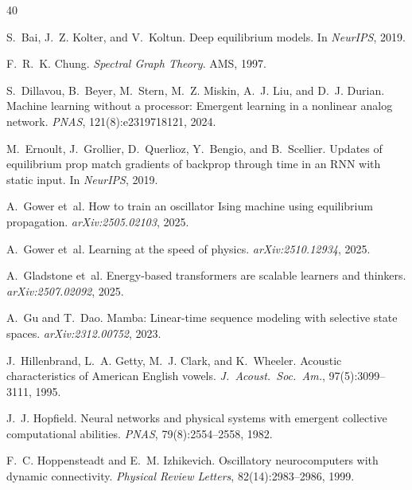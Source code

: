 \documentclass[11pt,a4paper]{article}
\begin{document}
\begin{thebibliography}{40}

S.~Bai, J.~Z. Kolter, and V.~Koltun.
\newblock Deep equilibrium models.
\newblock In \emph{NeurIPS}, 2019.

F.~R.~K. Chung.
\newblock \emph{Spectral Graph Theory}.
\newblock AMS, 1997.

S.~Dillavou, B.~Beyer, M.~Stern, M.~Z. Miskin, A.~J. Liu, and D.~J. Durian.
\newblock Machine learning without a processor: Emergent learning in a
  nonlinear analog network.
\newblock \emph{PNAS}, 121(8):e2319718121, 2024.

M.~Ernoult, J.~Grollier, D.~Querlioz, Y.~Bengio, and B.~Scellier.
\newblock Updates of equilibrium prop match gradients of backprop through time
  in an {RNN} with static input.
\newblock In \emph{NeurIPS}, 2019.

A.~Gower et~al.
\newblock How to train an oscillator {I}sing machine using equilibrium
  propagation.
\newblock \emph{arXiv:2505.02103}, 2025.

A.~Gower et~al.
\newblock Learning at the speed of physics.
\newblock \emph{arXiv:2510.12934}, 2025.

A.~Gladstone et~al.
\newblock Energy-based transformers are scalable learners and thinkers.
\newblock \emph{arXiv:2507.02092}, 2025.

A.~Gu and T.~Dao.
\newblock Mamba: Linear-time sequence modeling with selective state spaces.
\newblock \emph{arXiv:2312.00752}, 2023.

J.~Hillenbrand, L.~A. Getty, M.~J. Clark, and K.~Wheeler.
\newblock Acoustic characteristics of {A}merican {E}nglish vowels.
\newblock \emph{J.\ Acoust.\ Soc.\ Am.}, 97(5):3099--3111, 1995.

J.~J. Hopfield.
\newblock Neural networks and physical systems with emergent collective
  computational abilities.
\newblock \emph{PNAS}, 79(8):2554--2558, 1982.

F.~C. Hoppensteadt and E.~M. Izhikevich.
\newblock Oscillatory neurocomputers with dynamic connectivity.
\newblock \emph{Physical Review Letters}, 82(14):2983--2986, 1999.


\end{thebibliography}
\end{document}
